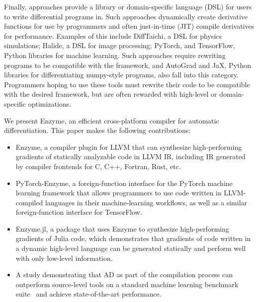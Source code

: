 Finally,  approaches provide a library or domain-specific language (DSL) for users to write differential programs in. Such approaches dynamically create derivative functions for use by programmers and often just-in-time (JIT) compile derivatives for performance. Examples of this include DiffTaichi\cite{hu2019difftaichi}, a DSL for physics simulations; Halide\cite{Li:2018:DPI}, a DSL for image processing; PyTorch\cite{paszke2017automatic}, 
and TensorFlow\cite{abadi2016tensorflow}, Python libraries for machine learning. Such approaches require rewriting programs to be compatible with the framework, and AutoGrad\cite{maclaurin2015autograd} and JaX\cite{jax2018github}, Python libraries for differentiating numpy-style programs, also fall into this category. Programmers hoping to use these tools must rewrite their code to be compatible with the desired framework, but are often rewarded with high-level or domain-specific optimizations.


We present Enzyme, an efficient cross-platform compiler for automatic differentiation.  This paper makes the following contributions:
\begin{itemize}

\item Enzyme, a compiler plugin for LLVM that can synthesize high-performing gradients of statically analyzable code in LLVM IR, including IR generated by compiler frontends for C, C++, Fortran, Rust, etc.

\item PyTorch-Enzyme, a foreign-function interface for the PyTorch machine learning framework that allows programmers to use code written in LLVM-compiled languages in their machine-learning workflows, as well as a similar foreign-function interface for TensorFlow.

\item Enzyme.jl, a package that uses Enzyme to synthesize high-performing gradients of Julia code, which demonstrates that gradients of code written in a dynamic high-level language can be generated statically and perform well with only low-level information.

\item A study demonstrating that AD as part of the compilation process can outperform source-level tools on a standard machine learning benchmark suite~\cite{adBench} and achieve state-of-the-art performance.
\end{itemize}


